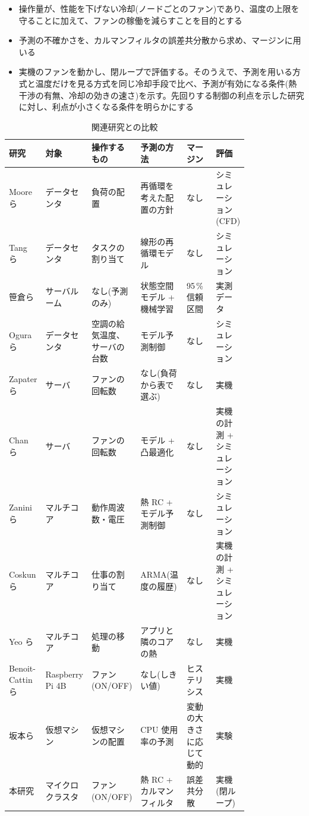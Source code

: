 \begin{itemize}
  \item 操作量が、性能を下げない冷却(ノードごとのファン)であり、温度の上限を守ることに加えて、ファンの稼働を減らすことを目的とする
  \item 予測の不確かさを、カルマンフィルタの誤差共分散から求め、マージンに用いる
  \item 実機のファンを動かし、閉ループで評価する。そのうえで、予測を用いる方式と温度だけを見る方式を同じ冷却手段で比べ、予測が有効になる条件(熱干渉の有無、冷却の効きの速さ)を示す。先回りする制御の利点を示した研究\cite{coskun2008proactive,yeo2008pdtm}に対し、利点が小さくなる条件を明らかにする
\end{itemize}

\begin{table}[tb]
  \centering
  \caption{関連研究との比較}
  \label{tab:rel-compare}
  \footnotesize
  \begin{tabular}{p{0.15\linewidth}p{0.12\linewidth}p{0.15\linewidth}p{0.13\linewidth}p{0.13\linewidth}p{0.12\linewidth}}
    \toprule
    研究 & 対象 & 操作するもの & 予測の方法 & マージン & 評価 \\
    \midrule
    Moore ら\cite{moore2005cool} & データセンタ & 負荷の配置 & 再循環を考えた配置の方針 & なし & シミュレーション(CFD) \\
    Tang ら\cite{tang2008sensor} & データセンタ & タスクの割り当て & 線形の再循環モデル & なし & シミュレーション \\
    笹倉ら\cite{sasakura2020} & サーバルーム & なし(予測のみ) & 状態空間モデル + 機械学習 & 95\,\% 信頼区間 & 実測データ \\
    Ogura ら\cite{ogura2018mpc} & データセンタ & 空調の給気温度、サーバの台数 & モデル予測制御 & なし & シミュレーション \\
    Zapater ら\cite{zapater2013leakage} & サーバ & ファンの回転数 & なし(負荷から表で選ぶ) & なし & 実機 \\
    Chan ら\cite{chan2018cooling} & サーバ & ファンの回転数 & モデル + 凸最適化 & なし & 実機の計測 + シミュレーション \\
    Zanini ら\cite{zanini2009multicore} & マルチコア & 動作周波数・電圧 & 熱 RC + モデル予測制御 & なし & シミュレーション \\
    Coskun ら\cite{coskun2008proactive} & マルチコア & 仕事の割り当て & ARMA(温度の履歴) & なし & 実機の計測 + シミュレーション \\
    Yeo ら\cite{yeo2008pdtm} & マルチコア & 処理の移動 & アプリと隣のコアの熱 & なし & 実機 \\
    Benoit-Cattin ら\cite{benoitcattin2020throttling} & Raspberry Pi 4B & ファン(ON/OFF) & なし(しきい値) & ヒステリシス & 実機 \\
    坂本ら\cite{sakamoto2018kbse} & 仮想マシン & 仮想マシンの配置 & CPU 使用率の予測 & 変動の大きさに応じて動的 & 実験 \\
    本研究 & マイクロクラスタ & ファン(ON/OFF) & 熱 RC + カルマンフィルタ & 誤差共分散 & 実機(閉ループ) \\
    \bottomrule
  \end{tabular}
\end{table}

